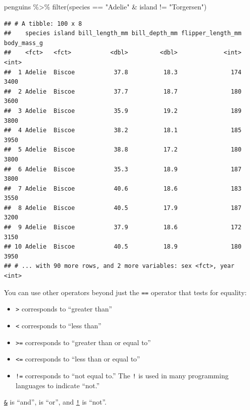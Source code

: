 \documentclass[
]{article}
\newenvironment{Shaded}{\begin{snugshade}}{\end{snugshade}}
\newcommand{\FunctionTok}[1]{\textcolor[rgb]{0.00,0.00,0.00}{#1}}
\newcommand{\NormalTok}[1]{#1}
\newcommand{\SpecialCharTok}[1]{\textcolor[rgb]{0.00,0.00,0.00}{#1}}
\newcommand{\StringTok}[1]{\textcolor[rgb]{0.31,0.60,0.02}{#1}}
\begin{document}
\begin{Shaded}
\begin{Highlighting}[]
\NormalTok{penguins }\SpecialCharTok{\%\textgreater{}\%} 
  \FunctionTok{filter}\NormalTok{(species }\SpecialCharTok{==} \StringTok{"Adelie"} \SpecialCharTok{\&}\NormalTok{ island }\SpecialCharTok{!=} \StringTok{"Torgersen"}\NormalTok{)}
\end{Highlighting}
\end{Shaded}

\begin{verbatim}
## # A tibble: 100 x 8
##    species island bill_length_mm bill_depth_mm flipper_length_mm body_mass_g
##    <fct>   <fct>           <dbl>         <dbl>             <int>       <int>
##  1 Adelie  Biscoe           37.8          18.3               174        3400
##  2 Adelie  Biscoe           37.7          18.7               180        3600
##  3 Adelie  Biscoe           35.9          19.2               189        3800
##  4 Adelie  Biscoe           38.2          18.1               185        3950
##  5 Adelie  Biscoe           38.8          17.2               180        3800
##  6 Adelie  Biscoe           35.3          18.9               187        3800
##  7 Adelie  Biscoe           40.6          18.6               183        3550
##  8 Adelie  Biscoe           40.5          17.9               187        3200
##  9 Adelie  Biscoe           37.9          18.6               172        3150
## 10 Adelie  Biscoe           40.5          18.9               180        3950
## # ... with 90 more rows, and 2 more variables: sex <fct>, year <int>
\end{verbatim}

You can use other operators beyond just the \texttt{==} operator that
tests for equality:

\begin{itemize}
\item
  \texttt{\textgreater{}} corresponds to ``greater than''
\item
  \texttt{\textless{}} corresponds to ``less than''
\item
  \texttt{\textgreater{}=} corresponds to ``greater than or equal to''
\item
  \texttt{\textless{}=} corresponds to ``less than or equal to''
\item
  \texttt{!=} corresponds to ``not equal to.'' The \texttt{!} is used in
  many programming languages to indicate ``not.''
\end{itemize}

\href{https://rdrr.io/r/base/Logic.html}{\texttt{\&}} is ``and'',
\href{https://rdrr.io/r/base/Logic.html}{\texttt{\textbar{}}} is ``or'',
and \href{https://rdrr.io/r/base/Logic.html}{\texttt{!}} is ``not''.
\end{document}
